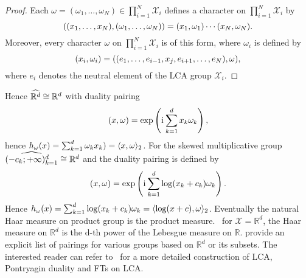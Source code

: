 \begin{proof}
Each $\omega=(\omega_1, \hdots, \omega_N)\in\prod_{i=1}^N\mathcal{X}_i$ defines a character on $\prod_{i=1}^N\mathcal{X}_i$ by
\begin{dmath*}
\pairing{(x_1, \hdots, x_N),(\omega_1, \hdots, \omega_N)}=\pairing{x_1,\omega_1}\cdots\pairing{x_N,\omega_N}.
\end{dmath*}
Moreover, every character $\omega$ on $\prod_{i=1}^N\mathcal{X}_i$ is of this form, where $\omega_i$ is defined by
\begin{dmath*}
\pairing{x_i,\omega_i}=\pairing{(e_1, \hdots, e_{i-1}, x_j, e_{i+1}, \hdots, e_N), \omega},
\end{dmath*}
where $e_i$ denotes the neutral element of the \ac{LCA} group $\mathcal{X}_i$.
\end{proof}
Hence $\widehat{\mathbb{R}^d}\cong\mathbb{R}^d$ with duality pairing
\begin{dmath*}
\pairing{x,\omega}=\exp\left(\iu\sum_{k=1}^d x_k\omega_k \right),
\end{dmath*} hence $h_\omega(x)=\sum_{k=1}^d\omega_k x_k)=\langle x,\omega\rangle_2$. For the skewed multiplicative group $\widehat{(-c_k;+\infty)_{k=1}^d}\cong\mathbb{R}^d$ and the duality pairing is defined by
\begin{dmath*}
\label{eq:pairing-skewed}
\pairing{x, \omega} = \exp\left(\iu\sum_{k=1}^d\log(x_k+c_k)\omega_k\right).
\end{dmath*}
Hence $h_\omega(x)=\sum_{k=1}^d \log(x_k+c_k)\omega_k=\langle\log(x+c),\omega\rangle_2$. Eventually the natural Haar measure on product group is the product measure. \Eg~for $\mathcal{X}=\mathbb{R}^d$, the Haar measure on $\mathbb{R}^d$ is the d-th power of the Lebesgue measure on $\mathbb{R}$.  provide an explicit list of pairings for various groups based on $\mathbb{R}^d$ or its subsets. The interested reader can refer to~\citet{folland1994course} for a more detailed construction of \ac{LCA}, Pontryagin duality and \acl{FT}s on \ac{LCA}.

